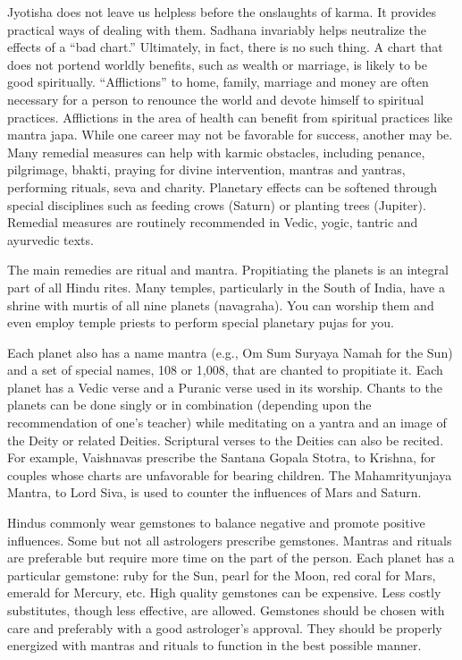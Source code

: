 Jyotisha does not leave us helpless before the onslaughts of karma. It provides practical ways of dealing with them. Sa­dhana invariably helps neutralize the effects of a “bad chart.” Ultimately, in fact, there is no such thing. A chart that does not portend worldly benefits, such as wealth or marriage, is likely to be good spiritually. “Afflictions” to home, family, marriage and money are often necessary for a person to renounce the world and devote himself to spiritual practices. Afflictions in the area of health can benefit from spiritual practices like mantra japa. While one career may not be favorable for success, another may be. Many remedial measures can help with karmic obstacles, including penance, pilgrimage, bhakti, praying for divine intervention, mantras and yantras, performing rituals, seva and charity. Planetary effects can be softened through special disciplines such as feeding crows (Saturn) or planting trees (Jupiter). Remedial measures are routinely recommended in Vedic, yogic, tantric and ayurvedic texts.

 

The main remedies are ritual and mantra. Propitiating the planets is an integral part of all Hindu rites. Many temples, particularly in the South of India, have a shrine with murtis of all nine planets (navagraha). You can worship them and even employ temple priests to perform special planetary pujas for you.

 

Each planet also has a name mantra (e.g., Om Sum Suryaya Namah for the Sun) and a set of special names, 108 or 1,008, that are chanted to propitiate it. Each planet has a Vedic verse and a Puranic verse used in its worship. Chants to the planets can be done singly or in combination (depending upon the recommendation of one’s teacher) while meditating on a yantra and an image of the Deity or related Deities. Scriptural verses to the Deities can also be recited. For example, Vaishnavas prescribe the Santana Gopala Stotra, to Krishna, for couples whose charts are unfavorable for bearing children. The Mahamrityunjaya Mantra, to Lord Siva, is used to counter the influences of Mars and Saturn.

 

Hindus commonly wear gemstones to balance negative and promote positive influences. Some but not all astrologers prescribe gemstones. Mantras and rituals are preferable but require more time on the part of the person. Each planet has a particular gemstone: ruby for the Sun, pearl for the Moon, red coral for Mars, emerald for Mercury, etc. High quality gemstones can be expensive. Less costly substitutes, though less effective, are allowed. Gemstones should be chosen with care and preferably with a good astrologer’s approval. They should be properly energized with mantras and rituals to function in the best possible manner.

